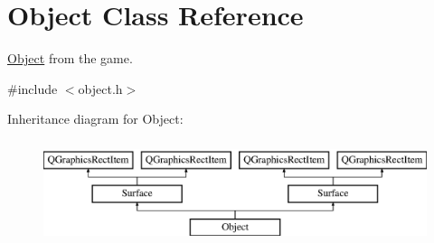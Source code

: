 \hypertarget{class_object}{}\section{Object Class Reference}
\label{class_object}


\hyperlink{class_object}{Object} from the game.  




{\ttfamily \#include $<$object.\+h$>$}

Inheritance diagram for Object\+:\begin{figure}[H]
\begin{center}
\leavevmode
\includegraphics[height=3.000000cm]{class_object}
\end{center}
\end{figure}

